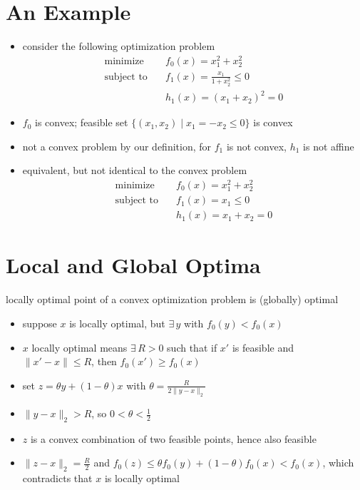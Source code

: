 \documentclass[11pt]{extarticle}
\newcommand{\ds}{\displaystyle}
\theoremstyle{definition}
\begin{document}
\newpage

\section*{An Example}
\begin{itemize}
  \item consider the following optimization problem
    \begin{align*}
      \text{minimize}\quad &f_0(x) = x_1^2 + x_2^2 \\
      \text{subject to}\quad &f_1(x) = \frac{x_1}{1 + x_2^2}\leqslant 0 \\
      \qquad\qquad &h_1(x) = (x_1 + x_2)^2 = 0
    \end{align*}
  \item $f_0$ is convex; feasible set $\{(x_1, x_2)\;|\; x_1 = -x_2\leqslant 0\}$ is convex
  \item not a convex problem by our definition, for $f_1$ is not convex, $h_1$ is not affine
  \item equivalent, but not identical to the convex problem
    \begin{align*}
      \text{minimize}\quad &f_0(x) = x_1^2 + x_2^2 \\
      \text{subject to}\quad &f_1(x) = x_1\leqslant 0 \\
      \qquad\qquad &h_1(x) = x_1 + x_2 = 0
    \end{align*}
\end{itemize}

\newpage

\section*{Local and Global Optima}
locally optimal point of a convex optimization problem is (globally) optimal
\begin{itemize}\setlength\itemsep{0em}
  \item suppose $x$ is locally optimal, but $\exists\,y$ with $f_0(y) < f_0(x)$
  \item $x$ locally optimal means $\exists\, R > 0$ such that if $x'$ is feasible and $\|x' - x\|\leqslant R$, then $f_0(x')\geqslant f_0(x)$ 
  \item set $\ds z = \theta y + (1 - \theta) x$ with $\ds\theta = \frac{R}{2\|y - x\|_2}$
  \item $\ds\|y - x\|_2 > R$, so $\ds 0 < \theta < \frac{1}{2}$
  \item $z$ is a convex combination of two feasible points, hence also feasible
  \item $\ds\|z - x\|_2 = \frac{R}{2}$ and $f_0(z)\leqslant\theta f_0(y) + (1 - \theta) f_0(x) < f_0(x)$, which contradicts that $x$ is locally optimal
\end{itemize}
\end{document}
